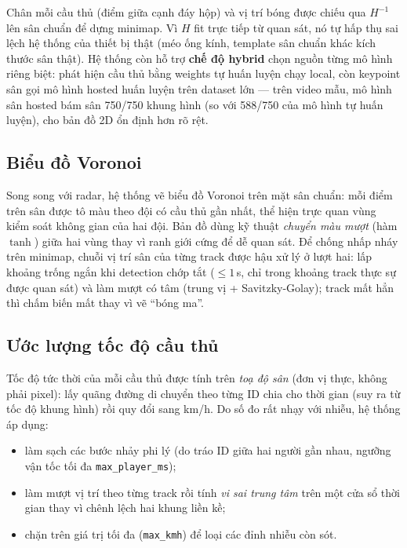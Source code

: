 \documentclass[12pt,a4paper]{article}
\begin{document}
Chân mỗi cầu thủ (điểm giữa cạnh đáy hộp) và vị trí bóng được chiếu qua $H^{-1}$ lên sân
chuẩn để dựng minimap. Vì $H$ fit trực tiếp từ quan sát, nó tự hấp thụ sai lệch hệ thống
của thiết bị thật (méo ống kính, template sân chuẩn khác kích thước sân thật). Hệ thống
còn hỗ trợ \textbf{chế độ hybrid} chọn nguồn từng mô hình riêng biệt: phát hiện cầu thủ
bằng weights tự huấn luyện chạy local, còn keypoint sân gọi mô hình hosted huấn luyện
trên dataset lớn --- trên video mẫu, mô hình sân hosted bám sân 750/750 khung hình (so
với 588/750 của mô hình tự huấn luyện), cho bản đồ 2D ổn định hơn rõ rệt.

\subsection{Biểu đồ Voronoi}
Song song với radar, hệ thống vẽ biểu đồ Voronoi trên mặt sân chuẩn: mỗi điểm trên sân
được tô màu theo đội có cầu thủ gần nhất, thể hiện trực quan vùng kiểm soát không gian của
hai đội. Bản đồ dùng kỹ thuật \emph{chuyển màu mượt} (hàm $\tanh$) giữa hai vùng thay vì
ranh giới cứng để dễ quan sát. Để chống nhấp nháy trên minimap, chuỗi vị trí sân của từng
track được hậu xử lý ở lượt hai: lấp khoảng trống ngắn khi detection chớp tắt ($\le 1$\,s,
chỉ trong khoảng track thực sự được quan sát) và làm mượt có tâm (trung vị + Savitzky-Golay);
track mất hẳn thì chấm biến mất thay vì vẽ ``bóng ma''.

\subsection{Ước lượng tốc độ cầu thủ}
Tốc độ tức thời của mỗi cầu thủ được tính trên \emph{toạ độ sân} (đơn vị thực, không phải
pixel): lấy quãng đường di chuyển theo từng ID chia cho thời gian (suy ra từ tốc độ khung
hình) rồi quy đổi sang km/h. Do số đo rất nhạy với nhiễu, hệ thống áp dụng:
\begin{itemize}[leftmargin=1.4em]
  \item làm sạch các bước nhảy phi lý (do tráo ID giữa hai người gần nhau, ngưỡng vận tốc
        tối đa \texttt{max\_player\_ms});
  \item làm mượt vị trí theo từng track rồi tính \emph{vi sai trung tâm} trên một cửa sổ
        thời gian thay vì chênh lệch hai khung liền kề;
  \item chặn trên giá trị tối đa (\texttt{max\_kmh}) để loại các đỉnh nhiễu còn sót.
\end{itemize}
\end{document}
